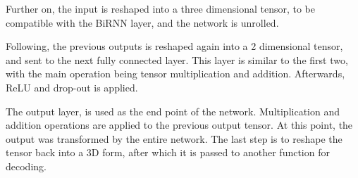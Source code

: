 
Further on, the input is reshaped into a three dimensional tensor, to be compatible with the BiRNN layer, and the network is unrolled. 

Following, the previous outputs is reshaped again into a 2 dimensional tensor, and sent to the next fully connected layer. 
This layer is similar to the first two, with the main operation being tensor multiplication and addition.
Afterwards, ReLU and drop-out is applied.

The output layer, is used as the end point of the network.
Multiplication and addition operations are applied to the previous output tensor. 
At this point, the output was  transformed by the entire network. 
The last step is to reshape the tensor back into a 3D form, after which it is passed to another function for decoding.


